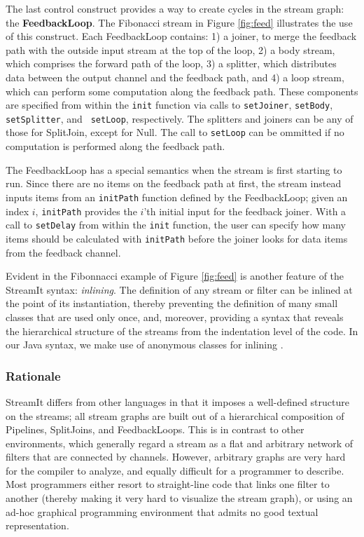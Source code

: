 The last control construct provides a way to create cycles in the
stream graph: the {\bf FeedbackLoop}.  The Fibonacci stream in Figure
\ref{fig:feed} illustrates the use of this construct.  Each FeedbackLoop
contains: 1) a joiner, to merge the feedback path with the outside
input stream at the top of the loop, 2) a body stream, which comprises
the forward path of the loop, 3) a splitter, which distributes data
between the output channel and the feedback path, and 4) a loop
stream, which can perform some computation along the feedback path.
These components are specified from within the {\tt init} function via
calls to {\tt setJoiner}, {\tt setBody}, {\tt setSplitter}, and {\tt
setLoop}, respectively.  The splitters and joiners can be any of those
for SplitJoin, except for Null.  The call to {\tt setLoop} can be
ommitted if no computation is performed along the feedback path.

The FeedbackLoop has a special semantics when the stream is first
starting to run.  Since there are no items on the feedback path at
first, the stream instead inputs items from an {\tt initPath} function
defined by the FeedbackLoop; given an index $i$, {\tt initPath}
provides the $i$'th initial input for the feedback joiner.  With a
call to {\tt setDelay} from within the {\tt init} function, the user
can specify how many items should be calculated with {\tt initPath}
before the joiner looks for data items from the feedback channel.

Evident in the Fibonnacci example of Figure \ref{fig:feed} is another
feature of the StreamIt syntax: {\it inlining}.  The definition of any
stream or filter can be inlined at the point of its instantiation,
thereby preventing the definition of many small classes that are used
only once, and, moreover, providing a syntax that reveals the
hierarchical structure of the streams from the indentation level of
the code.  In our Java syntax, we make use of anonymous classes for
inlining \cite{java}.

\subsubsection{Rationale}

StreamIt differs from other languages in that it imposes a
well-defined structure on the streams; all stream graphs are built out
of a hierarchical composition of Pipelines, SplitJoins, and
FeedbackLoops.  This is in contrast to other environments, which
generally regard a stream as a flat and arbitrary network of filters
that are connected by channels.  However, arbitrary graphs are very
hard for the compiler to analyze, and equally difficult for a
programmer to describe.  Most programmers either resort to
straight-line code that links one filter to another (thereby making it
very hard to visualize the stream graph), or using an ad-hoc graphical
programming environment that admits no good textual representation.

